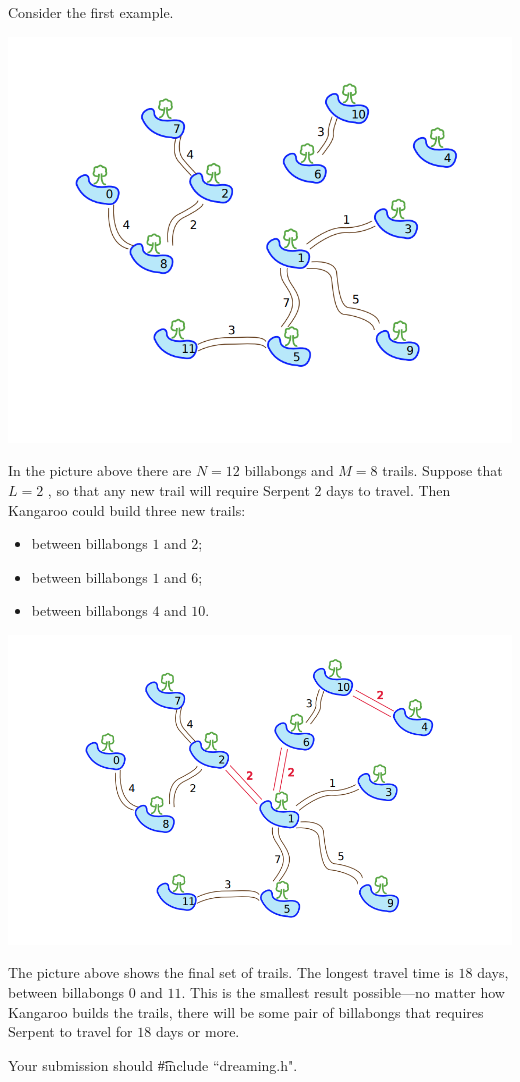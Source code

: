 Consider the first example.

\includegraphics{dreaming1.png}

In the picture above there are $N = 12$ billabongs and $M = 8$ trails. Suppose that $L = 2$ , so that any new trail will require Serpent $2$ days to travel. Then Kangaroo could build three
new trails:
\begin{itemize}
\item between billabongs $1$ and $2$;
\item between billabongs $1$ and $6$;
\item between billabongs $4$ and $10$.
\end{itemize}

\includegraphics{dreaming2.png}

The picture above shows the final set of trails. The longest travel time is $18$ days, between
billabongs $0$ and $11$. This is the smallest result possible---no matter how Kangaroo builds
the trails, there will be some pair of billabongs that requires Serpent to travel for $18$ days or
more.

Your submission should \t{\#include ``dreaming.h"}.